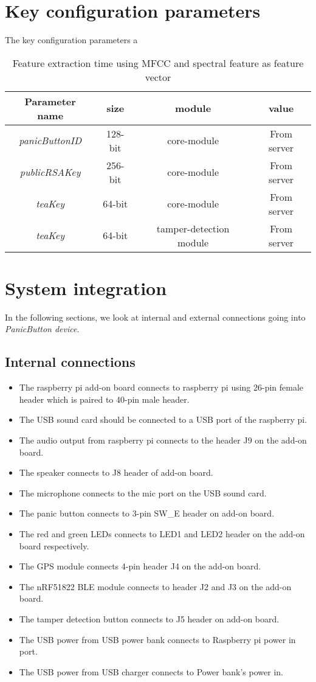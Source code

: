 \section{Key configuration parameters}
The key configuration parameters a
\begin{table}[H]
\begin{center}
\begin{tabular}{ |c|c|c|c| } 
 \hline
 \textbf{Parameter name} & \textbf{size} & \textbf{module} & \textbf{value} \\
 \hline 
 \hline
  \emph{panicButtonID} & 128-bit & core-module & From server\\
 \hline
 \emph{publicRSAKey} & 256-bit & core-module & From server\\
 \hline
 \emph{teaKey} & 64-bit & core-module & From server\\
 \hline
 \emph{teaKey} & 64-bit & tamper-detection module & From server\\
 \hline
\end{tabular}
\end{center}
\caption{Feature extraction time using MFCC and spectral feature as feature vector} \label{tab:scr2}
\end{table}
\section{System integration}
In the following sections, we look at internal and external connections going into \emph{PanicButton device}.
\subsection{Internal connections}
\begin{itemize}
\item The raspberry pi add-on board connects to raspberry pi  using 26-pin female header which is paired to 40-pin male header.
\item The USB sound card should be connected to a USB port of the raspberry pi.
\item The audio output from raspberry pi connects to the header J9  on the add-on board.
\item The speaker connects to J8 header of add-on board.
\item The microphone connects to the mic port on the USB sound card.
\item The panic button connects to 3-pin SW\_E header on add-on board.
\item The red and green LEDs connects to LED1 and LED2 header on the add-on board respectively.
\item The GPS module connects 4-pin header J4 on the add-on board.
\item The nRF51822 BLE module connects to header J2 and J3 on the add-on board.
\item The tamper detection button connects to J5 header on add-on board.
\item The USB power from USB power bank connects to Raspberry pi power in port.
\item The USB power from USB charger connects to Power bank's power in.
\end{itemize}
